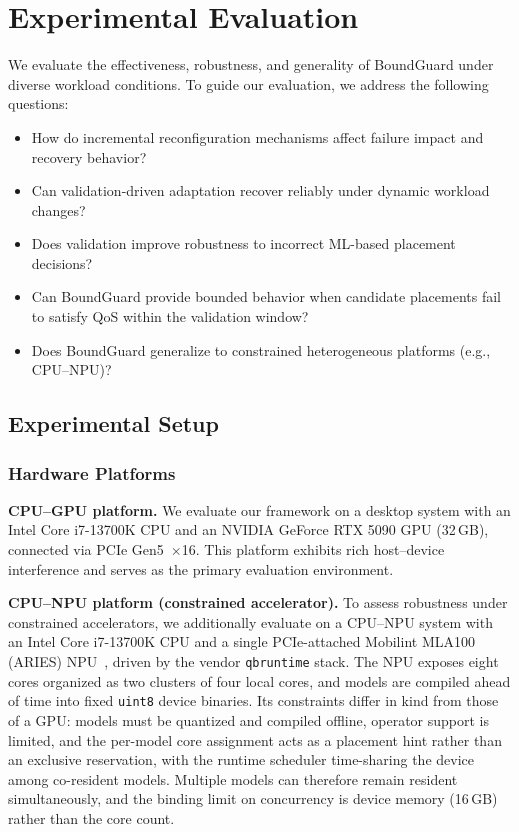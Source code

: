 \documentclass[conference]{IEEEtran}
\begin{document}
\section{Experimental Evaluation}
\label{sec:evaluation}

We evaluate the effectiveness, robustness, and generality of BoundGuard under diverse workload conditions.
To guide our evaluation, we address the following questions:

\begin{itemize}
\item[\textbf{Q1}] How do incremental reconfiguration mechanisms affect failure impact and recovery behavior?
\item[\textbf{Q2}] Can validation-driven adaptation recover reliably under dynamic workload changes?
\item[\textbf{Q3}] Does validation improve robustness to incorrect ML-based placement decisions?
\item[\textbf{Q4}] Can BoundGuard provide bounded behavior when candidate placements fail to satisfy QoS within the validation window?
\item[\textbf{Q5}] Does BoundGuard generalize to constrained heterogeneous platforms (e.g., CPU--NPU)?

\end{itemize}


\subsection{Experimental Setup}

\subsubsection{Hardware Platforms}

\noindent\textbf{\newline CPU--GPU platform.}
We evaluate our framework on a desktop system with an Intel Core i7-13700K CPU and an NVIDIA GeForce RTX 5090 GPU (32\,GB), connected via PCIe Gen5~$\times$16. 
This platform exhibits rich host--device interference and serves as the primary evaluation environment.

\noindent\textbf{CPU--NPU platform (constrained accelerator).}
\textcolor{navyblue}{To assess robustness under constrained accelerators, we additionally evaluate on a CPU--NPU system with an Intel Core i7-13700K CPU and a single PCIe-attached Mobilint MLA100 (ARIES) NPU~\cite{oh2025optimizing}, driven by the vendor \texttt{qbruntime} stack. The NPU exposes eight cores organized as two clusters of four local cores, and models are compiled ahead of time into fixed \texttt{uint8} device binaries. Its constraints differ in kind from those of a GPU: models must be quantized and compiled offline, operator support is limited, and the per-model core assignment acts as a placement hint rather than an exclusive reservation, with the runtime scheduler time-sharing the device among co-resident models. Multiple models can therefore remain resident simultaneously, and the binding limit on concurrency is device memory (16\,GB) rather than the core count.}
\end{document}
